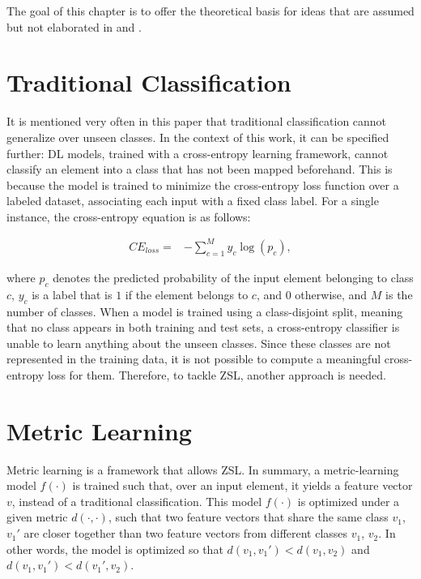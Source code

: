 The goal of this chapter is to offer the theoretical basis for ideas that are assumed but not elaborated in  and .

\section{Traditional Classification}

It is mentioned very often in this paper that traditional classification cannot generalize over unseen classes. In the context of this work, it can be specified further: \gls{DL} models, trained with a cross-entropy learning framework, cannot classify an element into a class that has not been mapped beforehand. This is because the model is trained to minimize the cross-entropy loss function over a labeled dataset, associating each input with a fixed class label. For a single instance, the cross-entropy equation is as follows:

\begin{equation}
    \label{cross_entropy}
    \begin{split}
        CE_{loss} = & -\sum_{c=1}^My_{c}\log(p_{c}),
    \end{split}
\end{equation}

where $p_{c}$ denotes the predicted probability of the input element belonging to class $c$, $y_{c}$ is a label that is $1$ if the element belongs to $c$, and $0$ otherwise, and $M$ is the number of classes. When a model is trained using a class-disjoint split, meaning that no class appears in both training and test sets, a cross-entropy classifier is unable to learn anything about the unseen classes. Since these classes are not represented in the training data, it is not possible to compute a meaningful cross-entropy loss for them. Therefore, to tackle \gls{ZSL}, another approach is needed.

\section{Metric Learning}

Metric learning is a framework that allows \gls{ZSL}. In summary, a metric-learning model \( f(\cdot) \) is trained such that, over an input element, it yields a feature vector $v$, instead of a traditional classification. This model \( f(\cdot) \) is optimized under a given metric \( d(\cdot, \cdot) \), such that two feature vectors that share the same class $v_1$, $v_1'$ are closer together than two feature vectors from different classes $v_1$, $v_2$. In other words, the model is optimized so that $d(v_1, v_1') < d(v_1, v_2)$ and $d(v_1, v_1') < d(v_1', v_2)$.

